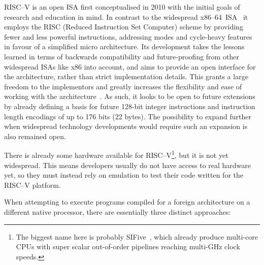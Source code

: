 RISC--V is an open ISA first conceptualised in 2010 with the initial goals of research and education in mind.
In contrast to the widespread x86--64~ISA~\cite{intel2017man} it employs the RISC (Reduced Instruction Set Computer) scheme by providing fewer and less powerful instructions, addressing modes and cycle-heavy features in favour of a simplified micro architecture.
Its development takes the lessons learned in terms of backwards compatibility and future-proofing from other widespread ISAs like x86 into account, and aims to provide an open interface for the architecture, rather than strict implementation details.
This grants a large freedom to the implementors and greatly increases the flexibility and ease of working with the architecture~\cite[S. 1f]{riscvspec}.
As such, it looks to be open to future extensions by already defining a basis for future 128-bit integer instructions and instruction length encodings of up to 176 bits (22 bytes).
The possibility to expand further when widespread technology developments would require such an expansion is also remained open.

There is already some hardware available for RISC--V\footnote{The biggest name here is probably SIFive~\cite{sifive}, which already produce multi-core CPUs with super scalar out-of-order pipelines reaching multi-GHz clock speeds.}, but it is not yet widespread.
This means developers usually do not have access to real hardware yet, so they must instead rely on emulation to test their code written for the RISC--V platform.

When attempting to execute programs compiled for a foreign architecture on a different native processor, there are essentially three distinct approaches:

